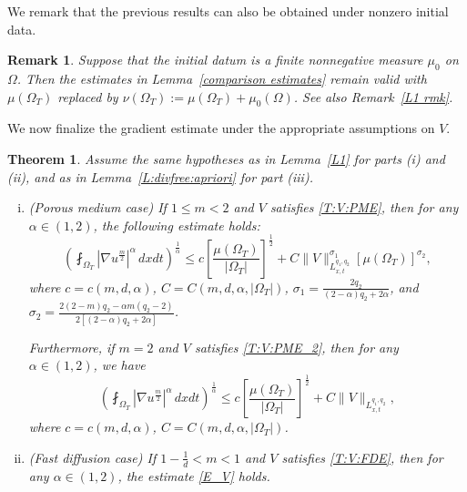 \documentclass{amsart}
\newtheorem{theorem}[defn]{Theorem}
\newtheorem{remark}[defn]{Remark}
\numberwithin{equation}{section}
\begin{document}
We remark that the previous results can also be obtained under nonzero initial data.
\begin{remark}\label{L2 rmk}
Suppose that the initial datum is a finite nonnegative measure $\mu_0$ on $\Omega$. Then the estimates in Lemma~\ref{comparison estimates} remain valid with $\mu(\Omega_T)$ replaced by
$\nu(\Omega_T):=\mu(\Omega_T)+\mu_0(\Omega)$. See also Remark~\ref{L1 rmk}.
\end{remark}







We now finalize the gradient estimate under the appropriate assumptions on $V$.


\begin{theorem}\label{T:final_est}
Assume the same hypotheses as in Lemma~\ref{L1} for parts (i) and (ii), and as in Lemma~\ref{L:divfree:apriori} for part (iii).

\begin{enumerate}[(i)]
	\item (Porous medium case) If $1\leq m < 2$ and $V$ satisfies \eqref{T:V:PME}, then for any $\alpha \in (1, 2)$, the following estimate holds:
	 \begin{equation}\label{E_V}
	\left(\fint_{\Omega_T} \left|\nabla u^{\frac{m}{2}}\right|^{\alpha} \,dxdt\right)^{\frac{1}{\alpha}}
\leq c\left[ \frac{\mu(\Omega_{T})}{|\Omega_T|}\right]^{\frac{1}{2}}
 + C \|V\|_{L_{x,t}^{q_1, q_2}}^{\sigma_1} \left[\mu(\Omega_{T})\right]^{\sigma_2},
   \end{equation}
   where $c=c(m,d,\alpha)$, $C=C(m,d,\alpha,|\Omega_{T}|)$, $\sigma_1 = \frac{2q_2}{(2-\alpha)q_2 +2 \alpha}$, and $\sigma_2=\frac{2(2-m)q_2-\alpha m (q_2-2)}{2[(2-\alpha)q_2 +2\alpha]}$.
	
	
	Furthermore, if $m=2$ and $V$ satisfies \eqref{T:V:PME_2}, then for any $\alpha \in (1,2)$, we have 
	\begin{equation}\label{E_V_2}
	\left(\fint_{\Omega_T} \left|\nabla u^{\frac{m}{2}}\right|^{\alpha} \,dxdt\right)^{\frac{1}{\alpha}}
\leq c\left[ \frac{\mu(\Omega_{T})}{|\Omega_T|}\right]^{\frac{1}{2}}
 + C \|V\|_{L_{x,t}^{q_1, q_2}},
   \end{equation}
   where $c=c(m,d,\alpha)$, $C=C(m,d,\alpha,|\Omega_{T}|)$. 
   
 \smallskip

 \item (Fast diffusion case) If $1-\frac{1}{d} < m < 1$ and $V$ satisfies \eqref{T:V:FDE}, then for any $\alpha \in (1, 2)$, the estimate \eqref{E_V} holds.
	


\end{enumerate}
\end{theorem}
\end{document}
